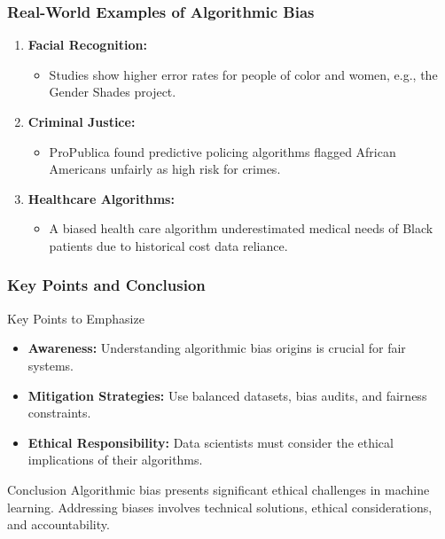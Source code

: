 \documentclass[aspectratio=169]{beamer}
\begin{document}
\begin{frame}[fragile]
    \frametitle{Real-World Examples of Algorithmic Bias}
    \begin{enumerate}
        \item \textbf{Facial Recognition:}
            \begin{itemize}
                \item Studies show higher error rates for people of color and women, e.g., the Gender Shades project.
            \end{itemize}
        
        \item \textbf{Criminal Justice:}
            \begin{itemize}
                \item ProPublica found predictive policing algorithms flagged African Americans unfairly as high risk for crimes.
            \end{itemize}
        
        \item \textbf{Healthcare Algorithms:}
            \begin{itemize}
                \item A biased health care algorithm underestimated medical needs of Black patients due to historical cost data reliance.
            \end{itemize}
    \end{enumerate}
    
\end{frame}

\begin{frame}[fragile]
    \frametitle{Key Points and Conclusion}
    \begin{block}{Key Points to Emphasize}
        \begin{itemize}
            \item \textbf{Awareness:} Understanding algorithmic bias origins is crucial for fair systems.
            \item \textbf{Mitigation Strategies:} Use balanced datasets, bias audits, and fairness constraints.
            \item \textbf{Ethical Responsibility:} Data scientists must consider the ethical implications of their algorithms.
        \end{itemize}
    \end{block}

    \begin{block}{Conclusion}
        Algorithmic bias presents significant ethical challenges in machine learning. Addressing biases involves technical solutions, ethical considerations, and accountability.
    \end{block}
    
\end{frame}
\end{document}
